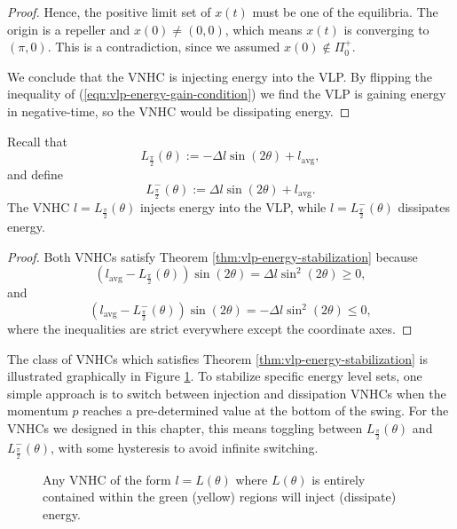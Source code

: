 \begin{proof}
   Hence, the positive limit set of \(x(t)\) must be one of the equilibria. 
   The origin is a repeller and \(x(0) \neq (0,0)\), which means \(x(t)\) is
   converging to \((\pi,0)\).
   This is a contradiction, since we assumed \(x(0) \not \in \Pi_0^+\).

   We conclude that the VNHC is injecting energy into the VLP.
   By flipping the inequality of (\ref{eqn:vlp-energy-gain-condition})
   we find the VLP is gaining energy in negative-time, so the VNHC would be
   dissipating energy.
\end{proof}

\begin{cor}
   Recall that
   \[
      L_\frac{\pi}{2}(\theta) := -\Delta l \sin(2\theta) + l_\text{avg}
      ,
   \]
   and define 
   \[
      L^{-}_\frac{\pi}{2}(\theta) := \Delta l \sin(2\theta) + l_\text{avg}
      .
   \]
   The VNHC \(l = L_\frac{\pi}{2}(\theta)\) injects energy into the VLP,
   while \(l = L^{-}_\frac{\pi}{2}(\theta)\) dissipates energy.
\end{cor}
\begin{proof}
   Both VNHCs satisfy Theorem \ref{thm:vlp-energy-stabilization} because
   \[
      \left(l_\text{avg} - L_\frac{\pi}{2}(\theta)\right)\sin(2\theta) = 
      \Delta l \sin^2(2\theta) \geq 0
      ,
   \] 
   and
   \[
      \left(l_\text{avg} - L^{-}_\frac{\pi}{2}(\theta)\right)\sin(2\theta) = 
      - \Delta l \sin^2(2\theta) \leq 0
      ,
   \] 
   where the inequalities are strict everywhere except the coordinate axes.
\end{proof}


The class of VNHCs which satisfies Theorem \ref{thm:vlp-energy-stabilization} is
illustrated graphically in Figure \ref{fig:vlp-energy-in-out}. 
To stabilize specific energy level sets, one simple approach is to switch
between injection and dissipation VNHCs when the momentum \(p\) reaches
a pre-determined value at the bottom of the swing.
For the VNHCs we designed in this chapter, this means toggling
between \(L_\frac{\pi}{2}(\theta)\) and \(L^{-}_\frac{\pi}{2}(\theta)\),
with some hysteresis to avoid infinite switching.  

\begin{figure}
   \centering
   
   \caption{Any VNHC of the form \(l = L(\theta)\) where \(L(\theta)\)
      is entirely contained within
      the green (yellow) regions will inject (dissipate) energy.}
      \label{fig:vlp-energy-in-out}
\end{figure}


